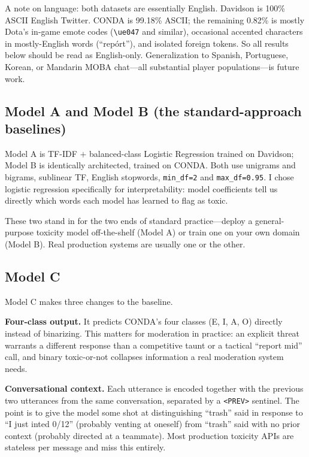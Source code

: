 \documentclass[11pt,twocolumn,letterpaper]{article}
\begin{document}
A note on language: both datasets are essentially English. Davidson is 100\% ASCII English Twitter. CONDA is 99.18\% ASCII; the remaining 0.82\% is mostly Dota's in-game emote codes (\texttt{\textbackslash ue047} and similar), occasional accented characters in mostly-English words (``rep\'{o}rt''), and isolated foreign tokens. So all results below should be read as English-only. Generalization to Spanish, Portuguese, Korean, or Mandarin MOBA chat---all substantial player populations---is future work.

\subsection{Model A and Model B (the standard-approach baselines)}

Model A is TF-IDF $+$ balanced-class Logistic Regression trained on Davidson; Model B is identically architected, trained on CONDA. Both use unigrams and bigrams, sublinear TF, English stopwords, \texttt{min\_df=2} and \texttt{max\_df=0.95}. I chose logistic regression specifically for interpretability: model coefficients tell us directly which words each model has learned to flag as toxic.

These two stand in for the two ends of standard practice---deploy a general-purpose toxicity model off-the-shelf (Model A) or train one on your own domain (Model B). Real production systems are usually one or the other.

\subsection{Model C}

Model C makes three changes to the baseline.

\textbf{Four-class output.} It predicts CONDA's four classes (E, I, A, O) directly instead of binarizing. This matters for moderation in practice: an explicit threat warrants a different response than a competitive taunt or a tactical ``report mid'' call, and binary toxic-or-not collapses information a real moderation system needs.

\textbf{Conversational context.} Each utterance is encoded together with the previous two utterances from the same conversation, separated by a \texttt{<PREV>} sentinel. The point is to give the model some shot at distinguishing ``trash'' said in response to ``I just inted 0/12'' (probably venting at oneself) from ``trash'' said with no prior context (probably directed at a teammate). Most production toxicity APIs are stateless per message and miss this entirely.
\end{document}

